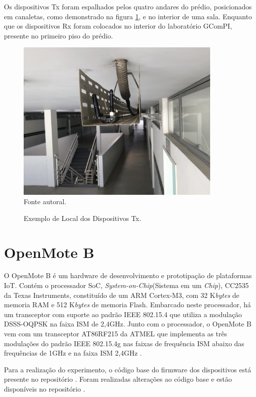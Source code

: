 Os dispositivos Tx foram espalhados pelos quatro andares do prédio, posicionados em canaletas, como demonstrado na figura \ref{fig:tx_canaleta}, e no interior de uma sala. Enquanto que os dispositivos Rx foram colocados no interior do laboratório GComPI, presente no primeiro piso do prédio.

\begin{figure}[h]
    \begin{center}
        \caption{Exemplo de Local dos Dispositivos Tx.}
        \includegraphics[width=10cm]{./sections/textual/chapters/images/tx_canaleta.jpg}\\
        Fonte autoral.
        \label{fig:tx_canaleta}
    \end{center}
\end{figure}

\section{OpenMote B}
O OpenMote B é um hardware de desenvolvimento e prototipação de plataformas IoT. Contém o processador SoC, \emph{System-on-Chip}(Sistema em um \emph{Chip}), CC2535 da Texas Instruments, constituído de um ARM Cortex-M3, com 32 K\emph{bytes} de memoria RAM e 512 K\emph{bytes} de memoria Flash. Embarcado neste processador, há um transceptor com suporte ao padrão IEEE 802.15.4 que utiliza a modulação DSSS-OQPSK na faixa ISM de 2,4GHz. Junto com o processador, o OpenMote B vem com um transceptor AT86RF215 da ATMEL que implementa as três modulações do padrão IEEE 802.15.4g nas faixas de frequência ISM abaixo das frequências de 1GHz e na faixa ISM 2,4GHz \cite{openmoteb-userguide}.

Para a realização do experimento, o código base do firmware dos dispositivos está presente no repositório \cite{openmoteb-firmware}. Foram realizadas alterações ao código base e estão disponíveis no repositório \cite{openmoteb-gcompi}.

